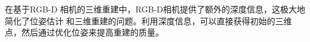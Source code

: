 



\par 在基于RGB-D 相机的三维重建中，RGB-D相机提供了额外的深度信息，这极大地简化了位姿估计
和三维重建的问题。利用深度信息，可以直接获得初始的三维点，然后通过优化位姿来提高重建的质量。